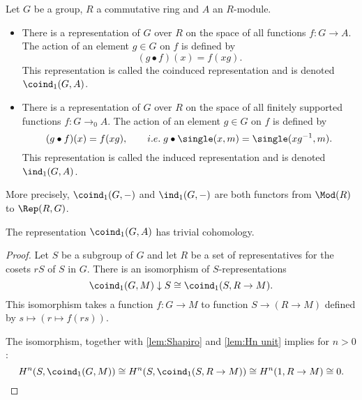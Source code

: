 \begin{definition} \label{def:induced}
	\leanok
	Let $G$ be a group, $R$ a commutative ring and $A$ an $R$-module.
	\begin{itemize}
		\item
		There is a representation of $G$ over $R$
		on the space of all functions $f : G \to A$. The action of an element $g \in G$ on $f$
		is defined by
		\[
			(g \bullet f) (x) = f(xg).
		\]
		This representation is called the coinduced representation and is denoted $\coind_1(G,A)$.
		\item
		There is a representation of $G$ over $R$
		on the space of all finitely supported functions $f : G \to_0 A$.
		The action of an element $g \in G$ on $f$ is defined by
		\[
			(g \bullet f) (x) = f(xg), \qquad i.e.\;
			g \bullet \single(x,m) = \single(xg^{-1},m).
		\]
		This representation is called the induced representation and is denoted $\ind_1(G,A)$.
	\end{itemize}
	More precisely, $\coind_1(G,-)$ and $\ind_1(G,-)$ are both functors from $\Mod(R)$ to $\Rep(R,G)$.
\end{definition}

\begin{lemma}	\label{lem:coind₁ trivial cohomology}
	\leanok
	The representation $\coind_1(G,A)$ has trivial cohomology.
\end{lemma}

\begin{proof}
	\leanok
	Let $S$ be a subgroup of $G$ and let $R$ be a set of representatives for the cosets $rS$
	of $S$ in $G$.
	There is an isomorphism of $S$-representations
	\[
		\coind_1(G,M) \downarrow S
		\cong
		\coind_1(S,R \to M).
	\]
	This isomorphism takes a function $f : G \to M$ to function $S \to (R \to M)$
	defined by $s \mapsto (r \mapsto f(rs))$.

	The isomorphism, together with \ref{lem:Shapiro} and \ref{lem:Hn unit} implies for $n >0$:
	\[
		H^n(S,\coind_1(G,M)) \cong
		H^n(S,\coind_1(S,R \to M)) \cong
		H^n(1,R \to M) \cong 0.
	\]
\end{proof}




